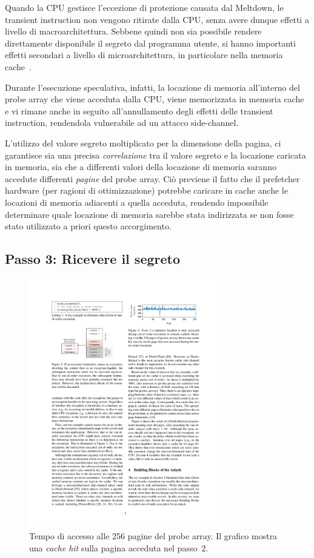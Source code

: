 Quando la CPU gestisce l'eccezione di protezione causata dal Meltdown, le transient instruction non vengono ritirate dalla CPU, senza avere dunque effetti a livello di macroarchitettura. Sebbene quindi non sia possibile rendere direttamente disponibile il segreto dal programma utente, si hanno importanti effetti secondari a livello di microarchitettura, in particolare nella memoria cache~\cite{lipp:meltdown}.

Durante l'esecuzione speculativa, infatti, la locazione di memoria all'interno del probe array che viene acceduta dalla CPU, viene memorizzata in memoria cache e vi rimane anche in seguito all'annullamento degli effetti delle transient instruction, rendendola vulnerabile ad un attacco side-channel.

L'utilizzo del valore segreto moltiplicato per la dimensione della pagina, ci garantisce sia una precisa \emph{correlazione} tra il valore segreto e la locazione caricata in memoria, sia che a differenti valori della locazione di memoria saranno accedute differenti \emph{pagine} del probe array.
Ciò previene il fatto che il prefetcher hardware (per ragioni di ottimizzazione) potrebbe caricare in cache anche le locazioni di memoria adiacenti a quella acceduta, rendendo impossibile determinare quale locazione di memoria sarebbe stata indirizzata se non fosse stato utilizzato a priori questo accorgimento.

\subsection{Passo 3: Ricevere il segreto}
\label{sec:meltdown-passo-3}

\begin{figure}
	\centering
	\includegraphics[width=0.75\textwidth]{"img/probe-array.pdf"}
	\caption{Tempo di accesso alle 256 pagine del probe array. Il grafico mostra una \emph{cache hit} sulla pagina acceduta nel passo~2.~\cite{lipp:meltdown}}
	\label{fig:probe-array}
\end{figure}


